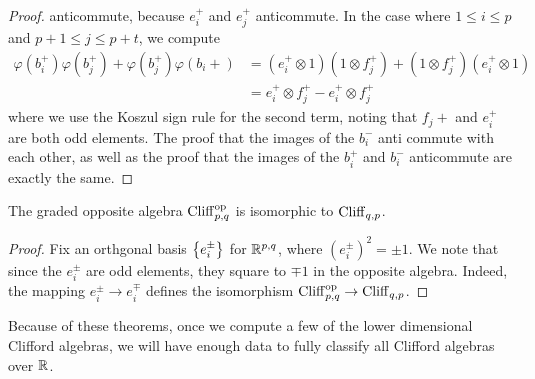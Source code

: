 \begin{proof}
anticommute, because $e_i^+$ and $e_j^+$ anticommute. In the case where
$1 \leq i \leq p$ and $p+1 \leq j \leq p+t$, we compute
%
\begin{align*}
\varphi(b_i^+)\varphi(b_j^+) + \varphi(b_j^+)\varphi(b_i+) &=
(e_i^+ \otimes 1)(1 \otimes f_j^+) + (1\otimes f_j^+)(e_i^+ \otimes 1) \\
&= e_i^+ \otimes f_j^+ - e_i^+ \otimes f_j^+
\end{align*}
where we use the Koszul sign rule for the second term, noting that $f_j+$ and
$e_i^+$ are both odd elements. The proof that the images of the $b_i^-$ anti commute with
each other, as well as the proof that the images of the $b_i^+$ and $b_i^-$
anticommute are exactly the same.
%
\end{proof}
%
\begin{thm}
The graded opposite algebra $\operatorname{Cliff}_{p,q}^{\text{op}}$ is isomorphic to
$\operatorname{Cliff}_{q,p}$.
\end{thm}
%
\begin{proof}
Fix an orthgonal basis $\left\lbrace e_i^\pm \right\rbrace$ for $\mathbb{R}^{p,q}$, where
$(e_i^\pm)^2 = \pm 1$. We note that since the $e_i^\pm$ are odd elements,
they square to $\mp 1$ in the opposite algebra. Indeed, the mapping
$e_i^\pm \to e_i^\mp$ defines the isomorphism
$\operatorname{Cliff}_{p,q}^\text{op} \to \operatorname{Cliff}_{q,p}$.
\end{proof}
%
Because of these theorems, once we compute a few of the lower dimensional
Clifford algebras, we will have enough data to fully classify all Clifford
algebras over $\mathbb{R}$.
%
